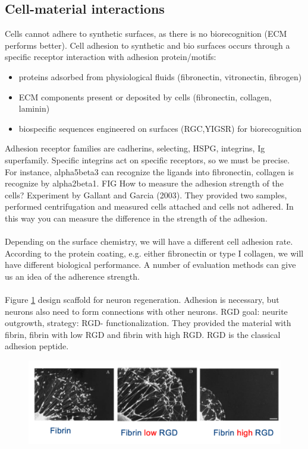\subsection{Cell-material interactions}
Cells cannot adhere to synthetic surfaces, as there is no biorecognition (ECM performs better).
Cell adhesion to synthetic and bio surfaces occurs through a specific receptor interaction with adhesion protein/motifs:
\begin{itemize}
\item proteins adsorbed from physiological fluids (fibronectin, vitronectin, fibrogen)
\item ECM components present or deposited by cells (fibronectin, collagen, laminin)
\item biospecific sequences engineered on surfaces (RGC,YIGSR) for biorecognition
\end{itemize}
Adhesion receptor families are cadherins, selecting, HSPG, integrins, Ig superfamily.
Specific integrins act on specific receptors, so we must be precise. For instance, alpha5beta3 can recognize the ligands into fibronectin, collagen is recognize by alpha2beta1. 
\noindent
FIG
How to measure the adhesion strength of the cells? Experiment by Gallant and Garcia (2003). They provided two samples, performed centrifugation and measured cells attached and cells not adhered. In this way you can measure the difference in the strength of the adhesion.
\\
\\
\noindent
Depending on the surface chemistry, we will have a different cell adhesion rate.  According to the protein coating, e.g. either fibronectin or type I collagen, we will have different biological performance. A number of evaluation methods can give us an idea of the adherence strength.
\\
\\
\noindent
Figure \ref{fig:fibrin} design scaffold for neuron regeneration. Adhesion is necessary, but neurons also need to form connections with other neurons. RGD goal: neurite outgrowth, strategy: RGD- functionalization. They provided the material with fibrin, fibrin with low RGD and fibrin with high RGD. RGD is the classical adhesion peptide. 
\begin{figure}[h]
\includegraphics[width=1\textwidth]{fibrin}
\caption{\label{fig:fibrin}}
\end{figure}
